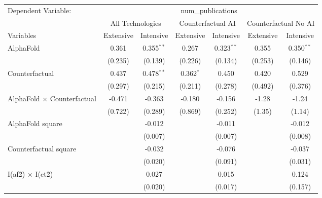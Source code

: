 \begingroup
\centering
\begin{tabular}{lcccccc}
   \tabularnewline \midrule \midrule
   Dependent Variable: & \multicolumn{6}{c}{num\_publications}\\
 & \multicolumn{2}{c}{All Technologies} & \multicolumn{2}{c}{Counterfactual AI} & \multicolumn{2}{c}{Counterfactual No AI} \\
\cmidrule(lr){1-1}\cmidrule(lr){2-3} \cmidrule(lr){4-5} \cmidrule(lr){6-7}
Variables & \multicolumn{1}{c}{Extensive} & \multicolumn{1}{c}{Intensive} & \multicolumn{1}{c}{Extensive} & \multicolumn{1}{c}{Intensive} & \multicolumn{1}{c}{Extensive} & \multicolumn{1}{c}{Intensive} \\
\cmidrule(lr){1-1}\cmidrule(lr){2-2} \cmidrule(lr){3-3} \cmidrule(lr){4-4} \cmidrule(lr){5-5} \cmidrule(lr){6-6} \cmidrule(lr){7-7}
   AlphaFold                          & 0.361   & 0.355$^{**}$ & 0.267       & 0.323$^{**}$ & 0.355   & 0.350$^{**}$\\   
                                      & (0.235) & (0.139)      & (0.226)     & (0.134)      & (0.253) & (0.146)\\   
   Counterfactual                     & 0.437   & 0.478$^{**}$ & 0.362$^{*}$ & 0.450        & 0.420   & 0.529\\   
                                      & (0.297) & (0.215)      & (0.211)     & (0.278)      & (0.492) & (0.376)\\   
   AlphaFold $\times$ Counterfactual  & -0.471  & -0.363       & -0.180      & -0.156       & -1.28   & -1.24\\   
                                      & (0.722) & (0.289)      & (0.869)     & (0.252)      & (1.35)  & (1.14)\\   
   AlphaFold square                   &         & -0.012       &             & -0.011       &         & -0.012\\   
                                      &         & (0.007)      &             & (0.007)      &         & (0.008)\\   
   Counterfactual square              &         & -0.032       &             & -0.076       &         & -0.037\\   
                                      &         & (0.020)      &             & (0.091)      &         & (0.031)\\   
   I(af\^2) $\times$ I(ct\^2)         &         & 0.027        &             & 0.015        &         & 0.124\\   
                                      &         & (0.020)      &             & (0.017)      &         & (0.157)\\   

\end{tabular}

